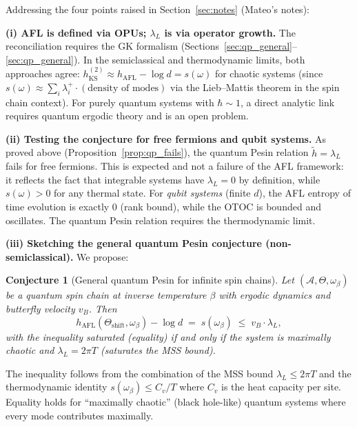 \documentclass[12pt,a4paper]{article}
\newtheorem{conjecture}[theorem]{Conjecture}
\begin{document}
Addressing the four points raised in Section~\ref{sec:notes} (Mateo's notes):

\medskip\noindent
\textbf{(i) AFL is defined via OPUs; $\lambda_L$ is via operator growth.}
The reconciliation requires the GK formalism (Sections~\ref{sec:qp_general}--\ref{sec:qp_general}).
In the semiclassical and thermodynamic limits, both approaches agree:
$h_{\mathrm{KS}}^{(2)} \approx h_{\mathrm{AFL}} - \log d = s(\omega)$ for chaotic
systems (since $s(\omega) \approx \sum_i \lambda_i^+ \cdot (\text{density of modes})$
via the Lieb--Mattis theorem in the spin chain context).  For purely quantum systems
with $\hbar \sim 1$, a direct analytic link requires quantum ergodic theory and is an
open problem.

\medskip\noindent
\textbf{(ii) Testing the conjecture for free fermions and qubit systems.}
As proved above (Proposition~\ref{prop:qp_fails}), the quantum Pesin relation
$\widetilde{h} = \lambda_L$ fails for free fermions.  This is expected and not a
failure of the AFL framework: it reflects the fact that integrable systems have
$\lambda_L = 0$ by definition, while $s(\omega) > 0$ for any thermal state.
For \emph{qubit systems} (finite $d$), the AFL entropy of time evolution is exactly 0
(rank bound), while the OTOC is bounded and oscillates.  The quantum Pesin relation
requires the thermodynamic limit.

\medskip\noindent
\textbf{(iii) Sketching the general quantum Pesin conjecture (non-semiclassical).}
We propose:

\begin{conjecture}[General quantum Pesin for infinite spin chains]
  \label{conj:gen_qp}
  Let $(\mathcal{A}, \Theta, \omega_\beta)$ be a quantum spin chain at inverse
  temperature $\beta$ with ergodic dynamics and butterfly velocity $v_B$.  Then
  \[
    h_{\mathrm{AFL}}(\Theta_{\mathrm{shift}}, \omega_\beta) - \log d
    \;=\; s(\omega_\beta)
    \;\leq\; v_B \cdot \lambda_L,
  \]
  with the inequality saturated (equality) if and only if the system is
  maximally chaotic and $\lambda_L = 2\pi T$ (saturates the MSS bound).
\end{conjecture}

\noindent
The inequality follows from the combination of the MSS bound
$\lambda_L \leq 2\pi T$ and the thermodynamic identity
$s(\omega_\beta) \leq C_v / T$ where $C_v$ is the heat capacity per site.
Equality holds for ``maximally chaotic'' (black hole-like) quantum systems where
every mode contributes maximally.
\end{document}
